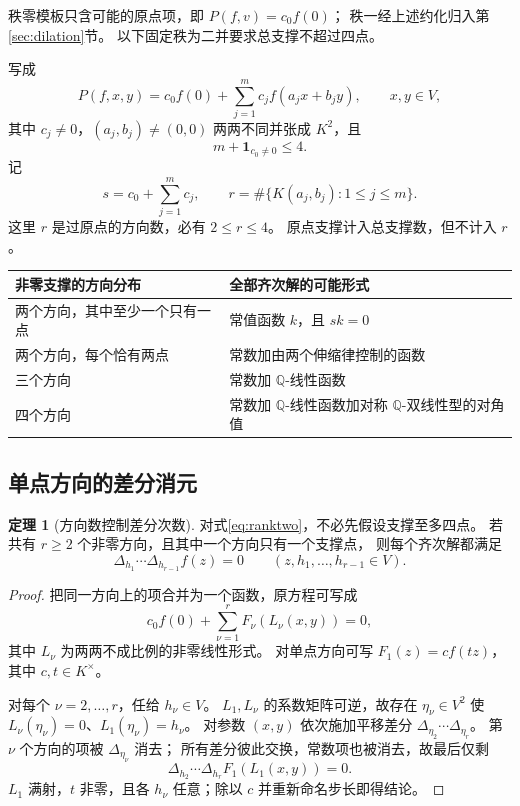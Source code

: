 \documentclass[UTF8,11pt,a4paper]{ctexart}
\theoremstyle{definition}
\newtheorem{theorem}{定理}[section]
\newcommand{\Q}{\mathbb Q}
\numberwithin{equation}{section}
\begin{document}
秩零模板只含可能的原点项，即 $P(f,v)=c_0f(0)$；
秩一经上述约化归入第\ref{sec:dilation}节。
以下固定秩为二并要求总支撑不超过四点。

写成
\begin{equation}\label{eq:ranktwo}
 P(f,x,y)=c_0f(0)+\sum_{j=1}^m c_jf(a_jx+b_jy),
 \qquad x,y\in V,
\end{equation}
其中 $c_j\ne0$，$(a_j,b_j)\ne(0,0)$ 两两不同并张成 $K^2$，且
\[
 m+\mathbf1_{c_0\ne0}\le4.
\]
记
\[
 s=c_0+\sum_{j=1}^m c_j,\qquad
 r=\#\{K(a_j,b_j):1\le j\le m\}.
\]
这里 $r$ 是过原点的方向数，必有 $2\le r\le4$。
原点支撑计入总支撑数，但不计入 $r$。

\begin{center}
\begin{tabular}{p{.40\linewidth}p{.50\linewidth}}
\toprule
非零支撑的方向分布 & 全部齐次解的可能形式\\
\midrule
两个方向，其中至少一个只有一点 & 常值函数 $k$，且 $sk=0$\\
两个方向，每个恰有两点 & 常数加由两个伸缩律控制的函数\\
三个方向 & 常数加 $\Q$-线性函数\\
四个方向 & 常数加 $\Q$-线性函数加对称 $\Q$-双线性型的对角值\\
\bottomrule
\end{tabular}
\end{center}

\subsection{单点方向的差分消元}
\begin{theorem}[方向数控制差分次数]\label{thm:singleton}
对式\eqref{eq:ranktwo}，不必先假设支撑至多四点。
若共有 $r\ge2$ 个非零方向，且其中一个方向只有一个支撑点，
则每个齐次解都满足
\begin{equation}\label{eq:directiondifference}
 \Delta_{h_1}\cdots\Delta_{h_{r-1}}f(z)=0
 \qquad(z,h_1,\ldots,h_{r-1}\in V).
\end{equation}
\end{theorem}
\begin{proof}
把同一方向上的项合并为一个函数，原方程可写成
\[
 c_0f(0)+\sum_{\nu=1}^rF_\nu(L_\nu(x,y))=0,
\]
其中 $L_\nu$ 为两两不成比例的非零线性形式。
对单点方向可写 $F_1(z)=cf(tz)$，其中 $c,t\in K^\times$。

对每个 $\nu=2,\ldots,r$，任给 $h_\nu\in V$。
$L_1,L_\nu$ 的系数矩阵可逆，故存在 $\eta_\nu\in V^2$ 使
$L_\nu(\eta_\nu)=0$、$L_1(\eta_\nu)=h_\nu$。
对参数 $(x,y)$ 依次施加平移差分
$\Delta_{\eta_2}\cdots\Delta_{\eta_r}$。
第 $\nu$ 个方向的项被 $\Delta_{\eta_\nu}$ 消去；
所有差分彼此交换，常数项也被消去，故最后仅剩
\[
 \Delta_{h_2}\cdots\Delta_{h_r}F_1(L_1(x,y))=0.
\]
$L_1$ 满射，$t$ 非零，且各 $h_\nu$ 任意；除以 $c$ 并重新命名步长即得结论。
\end{proof}
\end{document}

